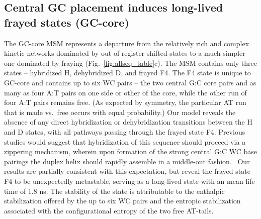 \documentclass[journal=jpcbfk,manuscript=article]{achemso}
\begin{document}
\subsection{Central GC placement induces long-lived frayed states (GC-core)} \label{sec:GC-core}

The GC-core MSM represents a departure from the relatively rich and complex kinetic networks dominated by out-of-register shifted states to a much simpler one dominated by fraying (Fig.~\ref{fig:allseq_table}c). The MSM contains only three states -- hybridized H, dehybridized D, and frayed F4. The F4 state is unique to GC-core and contains up to six WC pairs -- the two central G:C core pairs and as many as four A:T pairs on one side or other of the core, while the other run of four A:T pairs remains free. (As expected by symmetry, the particular AT run that is made vs.\ free occurs with equal probability.) Our model reveals the absence of any direct hybridization or dehybridization transitions between the H and D states, with all pathways passing through the frayed state F4. Previous studies would suggest that hybridization of this sequence should proceed via a zippering mechanism, wherein upon formation of the strong central G:C WC base pairings the duplex helix should rapidly assemble in a middle-out fashion.~\citep{Romano2013DNADependence, Yin2011KineticsHybridization} Our results are partially consistent with this expectation, but reveal the frayed state F4 to be unexpectedly metastable, serving as a long-lived state with an mean life time of 1.8 ns. The stability of the state is attributable to the enthalpic stabilization offered by the up to six WC pairs and the entropic stabilization associated with the configurational entropy of the two free AT-tails.
\end{document}

